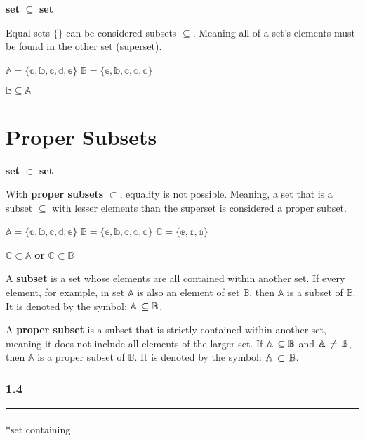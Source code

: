 \documentclass[
  letterpaper,
  DIV=11,
  numbers=noendperiod]{scrreprt}
\makeatletter
\let\oldparagraph\paragraph
\renewcommand{\paragraph}{
    \@ifstar
      \xxxParagraphStar
      \xxxParagraphNoStar
  }
\newcommand{\xxxParagraphStar}[1]{\oldparagraph*{#1}\mbox{}}
\newcommand{\xxxParagraphNoStar}[1]{\oldparagraph{#1}\mbox{}}
\makeatother
\begin{document}
\textbf{set} \(\subseteq\) \textbf{set}

Equal sets \(\{ \}\) can be considered subsets \(\subseteq\). Meaning
all of a set's elements must be found in the other set (superset).

\(\mathbb{A}= \{ \mathbb{a, b, c, d, e} \}\)
\(\mathbb{B}= \{ \mathbb{e, b, c, a, d} \}\)

\(\mathbb{B} \subseteq \mathbb{A}\)

\section{Proper Subsets}

\textbf{set} \(\subset\) \textbf{set}

With {\textbf{proper subsets}} \(\subset\), equality is not possible.
Meaning, a set that is a subset \(\subseteq\) with lesser elements than
the superset is considered a proper subset.

\(\mathbb{A}= \{ \mathbb{a, b, c, d, e} \}\)
\(\mathbb{B}= \{ \mathbb{e, b, c, a, d} \}\)
\(\mathbb{C}= \{ \mathbb{e, c, a} \}\)

\(\mathbb{C} \subset \mathbb{A}\) \textbf{or}
\(\mathbb{C} \subset \mathbb{B}\)

A {\textbf{subset}} is a set whose elements are all contained within
another set. If every element, for example, in set \(\mathbb{A}\) is
also an element of set \(\mathbb{B}\), then \(\mathbb{A}\) is a subset
of \(\mathbb{B}\). It is denoted by the symbol:
\(\mathbb{A} \thinspace \subseteq \mathbb{B}\).

A {\textbf{proper subset}} is a subset that is strictly contained within
another set, meaning it does not include all elements of the larger set.
If \(\mathbb{A} \thinspace \subseteq \mathbb{B}\) and
\(\mathbb{A} \thinspace \ne \thinspace \mathbb{B}\), then \(\mathbb{A}\)
is a proper subset of \(\mathbb{B}\). It is denoted by the symbol:
\(\mathbb{A} \thinspace \subset \thinspace \mathbb{B}\).

\subsubsection*{1.4}\label{section-7}

\begin{center}\rule{0.5\linewidth}{0.5pt}\end{center}

\paragraph*{set containing}\label{set-containing}
\end{document}
